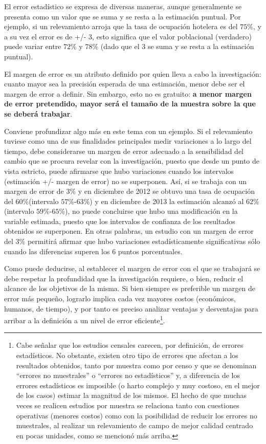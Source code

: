 \documentclass[
]{book}
\begin{document}
El error estadístico se expresa de diversas maneras, aunque generalmente se presenta como un valor que se suma y se resta a la estimación puntual. Por ejemplo, si un relevamiento arroja que la tasa de ocupación hotelera es del \(75\%\), y a su vez el error es de +/- 3, esto significa que el valor poblacional (verdadero) puede variar entre \(72\%\) y \(78\%\) (dado que el 3 se suma y se resta a la estimación puntual).

El margen de error es un atributo definido por quien lleva a cabo la investigación: cuanto mayor sea la precisión esperada de una estimación, menor debe ser el margen de error a definir. Sin embargo, esto no es gratuito: \textbf{a menor margen de error pretendido, mayor será el tamaño de la muestra sobre la que se deberá trabajar}.

Conviene profundizar algo más en este tema con un ejemplo. Si el relevamiento tuviese como una de sus finalidades principales medir variaciones a lo largo del tiempo, debe considerarse un margen de error adecuado a la sensibilidad del cambio que se procura revelar con la investigación, puesto que desde un punto de vista estricto, puede afirmarse que hubo variaciones cuando los intervalos (estimación +/- margen de error) no se superponen. Así, si se trabaja con un margen de error de 3\% y en diciembre de 2012 se obtuvo una tasa de ocupación del \(60\%\)(intervalo \(57\%\)-\(63\%\)) y en diciembre de 2013 la estimación alcanzó al \(62\%\) (intervalo \(59\%\)-\(65\%\)), no puede concluirse que hubo una modificación en la variable estimada, puesto que los intervalos de confianza de los resultados obtenidos se superponen. En otras palabras, un estudio con un margen de error del 3\% permitirá afirmar que hubo variaciones estadísticamente significativas sólo cuando las diferencias superen los 6 puntos porcentuales.

Como puede deducirse, al establecer el margen de error con el que se trabajará se debe respetar la profundidad que la investigación requiere, o bien, reducir el alcance de los objetivos de la misma. Si bien siempre es preferible un margen de error más pequeño, lograrlo implica cada vez mayores costos (económicos, humanos, de tiempo), y por tanto es preciso analizar ventajas y desventajas para arribar a la definición a un nivel de error eficiente\footnote{Cabe señalar que los estudios censales carecen, por definición, de errores estadísticos. No obstante, existen otro tipo de errores que afectan a los resultados obtenidos, tanto por muestra como por censo y que se denominan ``errores no muestrales'' o ``errores no estadísticos'' y, a diferencia de los errores estadísticos es imposible (o harto complejo y muy costoso, en el mejor de los casos) estimar la magnitud de los mismos. El hecho de que muchas veces se realicen estudios por muestra se relaciona tanto con cuestiones operativas (menores costos) como con la posibilidad de reducir los errores no muestrales, al realizar un relevamiento de campo de mejor calidad centrado en pocas unidades, como se mencionó más arriba.}.
\end{document}

